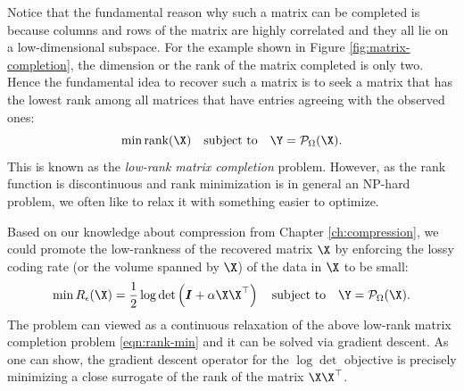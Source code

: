 \documentclass[../../book-main.tex]{subfiles}
\begin{document}
Notice that the fundamental reason why such a matrix can be completed
is because columns and rows of the matrix are highly correlated and
they all lie on a low-dimensional subspace. For the example shown in
Figure \ref{fig:matrix-completion}, the dimension or the rank of the
matrix completed is only two. Hence the fundamental idea to recover
such a matrix is to seek a matrix that has the lowest rank among all
matrices that have entries agreeing with the observed ones:
\begin{equation}
\min \mbox{rank}(\X) \quad \mbox{subject to}
\quad
\Y = \mathcal{P}_{\Omega}(\X).
\label{eqn:rank-min}
\end{equation}
This is known as the {\em low-rank matrix completion} problem.
However, as the rank function is discontinuous and rank minimization
is in general an NP-hard problem, we often like to relax it with
something easier to optimize.

Based on our knowledge about compression from Chapter
\ref{ch:compression}, we could  promote the low-rankness of the
recovered matrix $\X$ by enforcing the lossy coding rate (or the
volume spanned by $\X$) of the data in $\X$ to be small:
\begin{equation}
\min R_\epsilon(\X) = \frac{1}{2} \log \det \left(\boldsymbol{I} +
\alpha  \X\X^\top \right) \quad \mbox{subject to}
\quad
\Y = \mathcal{P}_{\Omega}(\X).
\label{eqn:rate-min}
\end{equation}
The problem can viewed as a continuous relaxation of the above
low-rank matrix completion problem \eqref{eqn:rank-min} and it can be
solved via gradient descent. As one can show, the gradient descent
operator for the $\log\det$ objective is precisely minimizing a close
surrogate of the rank of the matrix $\X\X^\top$.
\end{document}
